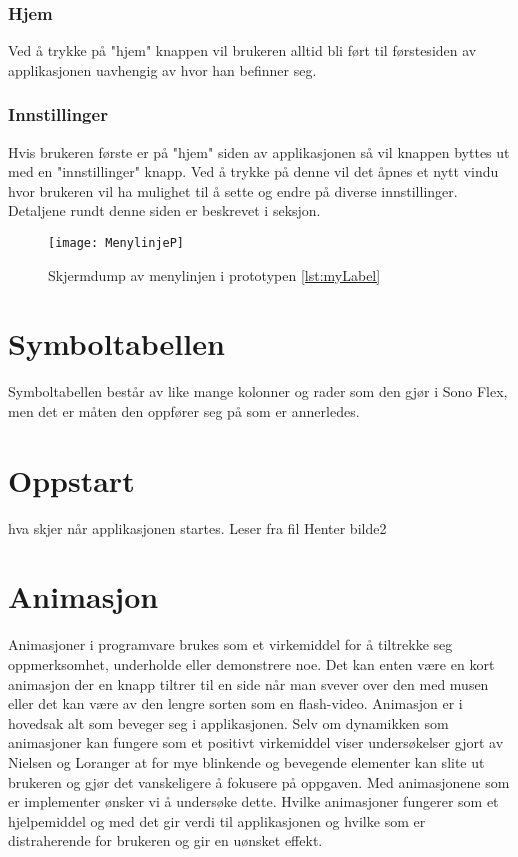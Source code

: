 { 
\subsubsection{Hjem} 
Ved å trykke på "hjem" knappen vil brukeren alltid bli ført til førstesiden av applikasjonen uavhengig av hvor han befinner seg.  
 
 
\subsubsection{Innstillinger} 
Hvis brukeren første er på "hjem" siden av applikasjonen så vil knappen byttes ut med en "innstillinger" knapp. Ved å trykke på denne vil det åpnes et nytt vindu hvor brukeren vil ha mulighet til å sette og endre på diverse innstillinger. Detaljene rundt denne siden er beskrevet i seksjon. 
 
 
\begin{figure}[ht!] 
\centering 
\texttt{[image: MenylinjeP]} 
\caption{Skjermdump av menylinjen i prototypen \ref{lst:myLabel}} 
\label{fig:menylinjen} 
\end{figure} 
 
 
 
\section{Symboltabellen} 
 
 
Symboltabellen består av like mange kolonner og rader som den gjør i Sono Flex,  men det er måten den oppfører seg på som er annerledes.   
 
 
 
\section{Oppstart} 
hva skjer når applikasjonen startes. 
Leser fra fil 
Henter bilde2 
 
 
 
 
 
 
\section{Animasjon} 
 
 
Animasjoner i programvare brukes som et virkemiddel for å tiltrekke seg oppmerksomhet, underholde eller demonstrere noe. Det kan enten være en kort animasjon der en knapp tiltrer til en side når man svever over den med musen eller det kan være av den lengre sorten som en flash-video.  Animasjon er i hovedsak alt som beveger seg i applikasjonen. Selv om dynamikken som animasjoner kan fungere som et positivt virkemiddel viser undersøkelser gjort av Nielsen og Loranger \cite{NielsenBok}  at for mye blinkende og bevegende elementer kan slite ut brukeren og gjør det vanskeligere å fokusere på oppgaven. Med animasjonene som er implementer ønsker vi å undersøke dette. Hvilke animasjoner fungerer som et hjelpemiddel og med det gir verdi til applikasjonen og hvilke som er distraherende for brukeren og gir en uønsket effekt. 
 
}
